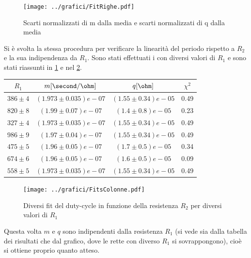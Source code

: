 \documentclass[a4paper,10pt]{article}
\begin{document}


\begin{figure}[H]
	\centering
	\texttt{[image: ../grafici/FitRighe.pdf]}
	\caption{Scarti normalizzati di m dalla media e scarti normalizzati di q dalla media}
	\label{fig:FitRighe}
\end{figure}




Si è svolta la stessa procedura per verificare la linearità del periodo rispetto a $R_2$ e la sua indipendenza da $R_1$. Sono stati effettuati i con diversi valori di $R_1$ e sono stati riassunti in \cref{tab:FitsColonne} e nel \cref{fig:FitsColonne}.

\begin{table}[H]
\centering
\begin{tabular}{c|c|c|c} 
$R_1$ & $m [\second/\ohm]$ & $q [\ohm]$ & $\chi^2$\\
\hline
$386 \pm 4$ & $(1.973 \pm 0.035)e-07$ & $(1.55 \pm 0.34)e-05 $& 0.49\\
$820 \pm 8$ & $(1.99  \pm 0.07)e-07 $&  $(1.4  \pm 0.8)e-05 $& 0.23\\
$327 \pm 4$ & $(1.973 \pm 0.035)e-07 $& $(1.55 \pm 0.34)e-05 $& 0.49\\
$986 \pm 9$ & $(1.97  \pm  0.04)e-07 $& $(1.55 \pm 0.34)e-05 $& 0.49\\
$475 \pm 5$ & $(1.96  \pm 0.05)e-07 $&  $(1.7  \pm 0.5)e-05 $& 0.34\\
$674 \pm 6$ & $(1.96  \pm 0.05)e-07 $&  $(1.6  \pm 0.5)e-05 $& 0.09\\
$558 \pm 5$ & $(1.973 \pm 0.035)e-07 $& $(1.55 \pm 0.34)e-05 $& 0.49\\
\end{tabular}
\label{tab:FitsColonne}
\end{table}

\begin{figure}[H]
	\centering
	\texttt{[image: ../grafici/FitsColonne.pdf]}
	\caption{Diversi fit del duty-cycle in funzione della resistenza $R_2$ per diversi valori di $R_1$}
	\label{fig:FitsColonne}
\end{figure}


Questa volta $m$ e $q$ sono indipendenti dalla resistenza $R_1$ (si vede sia dalla tabella dei risultati che dal grafico, dove le rette con diverso $R_1$ si sovrappongono), cioè si ottiene proprio quanto atteso.
\end{document}
